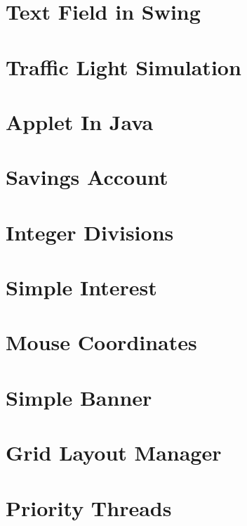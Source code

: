 \documentclass{article}
\begin{document}
\section{Text Field in Swing}

\newpage

\section{Traffic Light Simulation}

\newpage

\section{Applet In Java}

\newpage

\section{Savings Account}

\newpage

\section{Integer Divisions}

\newpage

\section{Simple Interest}

\newpage

\section{Mouse Coordinates}

\newpage

\section{Simple Banner}

\newpage

\section{Grid Layout Manager}

\newpage

\section{Priority Threads}

\newpage
\end{document}
